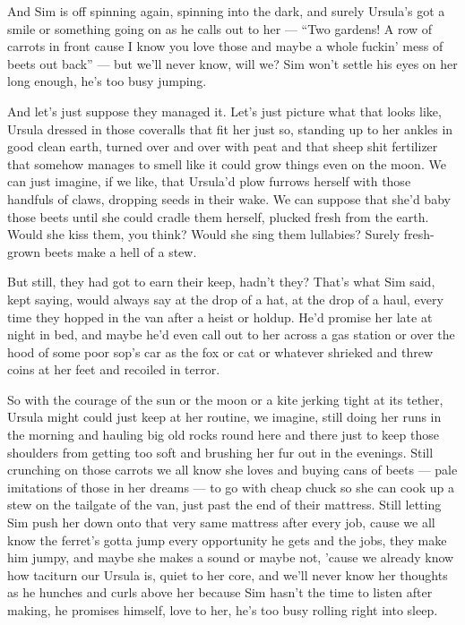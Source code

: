 And Sim is off spinning again, spinning into the dark, and surely Ursula's got a smile or something going on as he calls out to her --- ``Two gardens! A row of carrots in front cause I know you love those and maybe a whole fuckin' mess of beets out back'' --- but we'll never know, will we? Sim won't settle his eyes on her long enough, he's too busy jumping.

And let's just suppose they managed it. Let's just picture what that looks like, Ursula dressed in those coveralls that fit her just so, standing up to her ankles in good clean earth, turned over and over with peat and that sheep shit fertilizer that somehow manages to smell like it could grow things even on the moon. We can just imagine, if we like, that Ursula'd plow furrows herself with those handfuls of claws, dropping seeds in their wake. We can suppose that she'd baby those beets until she could cradle them herself, plucked fresh from the earth. Would she kiss them, you think? Would she sing them lullabies? Surely fresh-grown beets make a hell of a stew.

But still, they had got to earn their keep, hadn't they? That's what Sim said, kept saying, would always say at the drop of a hat, at the drop of a haul, every time they hopped in the van after a heist or holdup. He'd promise her late at night in bed, and maybe he'd even call out to her across a gas station or over the hood of some poor sop's car as the fox or cat or whatever shrieked and threw coins at her feet and recoiled in terror.

So with the courage of the sun or the moon or a kite jerking tight at its tether, Ursula might could just keep at her routine, we imagine, still doing her runs in the morning and hauling big old rocks round here and there just to keep those shoulders from getting too soft and brushing her fur out in the evenings. Still crunching on those carrots we all know she loves and buying cans of beets --- pale imitations of those in her dreams --- to go with cheap chuck so she can cook up a stew on the tailgate of the van, just past the end of their mattress. Still letting Sim push her down onto that very same mattress after every job, cause we all know the ferret's gotta jump every opportunity he gets and the jobs, they make him jumpy, and maybe she makes a sound or maybe not, 'cause we already know how taciturn our Ursula is, quiet to her core, and we'll never know her thoughts as he hunches and curls above her because Sim hasn't the time to listen after making, he promises himself, love to her, he's too busy rolling right into sleep.

